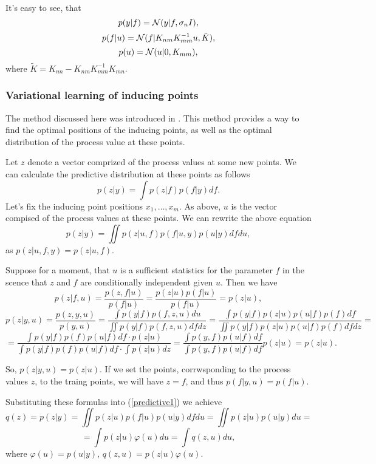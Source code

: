 \documentclass[12pt]{article}
\begin{document}
	It's easy to see, that
	$$p(y|f) = \mathcal{N} (y|f, \sigma_n I),$$
	$$p(f|u) = \mathcal{N} (f|K_{nm} K_{mm}^{-1}u, \tilde K),$$
	$$p(u) = \mathcal{N}(u|0, K_{mm}),$$
	where $\tilde K = K_{nn} - K_{nm} K_{mm}^{-1} K_{mn}.$
		
	\subsubsection{Variational learning of inducing points}
		\label{Titsias}
		
		\hspace{0.6cm}The method discussed here was introduced in \cite{Titsias}. This method provides a way to find the optimal positions of the inducing points, as well as the optimal distribution of the process value at these points.

		Let $z$ denote a vector comprized of the process values at some new points. We can calculate the predictive distribution at these points as follows
		$$p(z|y) = \int p(z|f) p(f|y) df.$$
		Let's fix the inducing point positions $x_1, \ldots, x_m$. As above, $u$ is the vector compised of the process values at these points. We can rewrite the above equation
		\begin{equation}
			\label{predictive1}
			p(z|y) = \iint p(z|u, f) p(f| u, y) p(u|y)df du,
		\end{equation}
		as $p(z|u, f, y) = p(z|u, f)$. 

		Suppose for a moment, that $u$ is a sufficient statistics for the parameter $f$ in the scence that $z$ and $f$ are conditionally independent given $u$. Then we have 
		$$p(z|f, u) = \frac {p(z, f|u)} {p(f|u)} = \frac {p(z | u) p(f | u)}{p(f|u)} = p(z|u),$$
		$$p(z|y, u) = \frac {p(z, y, u)}{p(y, u)} = \frac {\int p(y|f)p(f, z, u) du}{\iint p(y|f) p(f, z, u) df dz} = \frac {\int p(y|f) p(z|u) p(u|f) p(f)df}{\iint p(y|f) p(z|u) p(u|f) p(f)df dz} = $$
		$$= \frac {\int p(y|f)p(f)p(u|f)df \cdot p(z|u)} {\int p(y|f)p(f)p(u|f)df \cdot \int p(z|u) dz} = \frac{\int p(y, f) p(u|f) df} {\int p(y, f) p(u|f) df} p(z|u) = p(z|u).$$

		So, $p(z|y, u) = p(z|u)$. If we set the points, corrwsponding to the process values $z$, to the traing points, we will have $z = f$, and thus $p(f|y, u) = p(f|u)$.

		Substituting these formulas into (\ref{predictive1}) we achieve
		$$q(z) = p(z|y) = \iint p(z|u) p(f|u) p(u|y)df du = \iint p(z|u) p(u|y) du = $$
		\begin{equation}
			\label{predictive2}
			= \int p(z|u)\varphi(u) du  = \int q(z, u) du, 
		\end{equation}
		where $\varphi(u) = p(u|y)$, $q(z, u) = p(z|u)\varphi(u)$.
\end{document}
